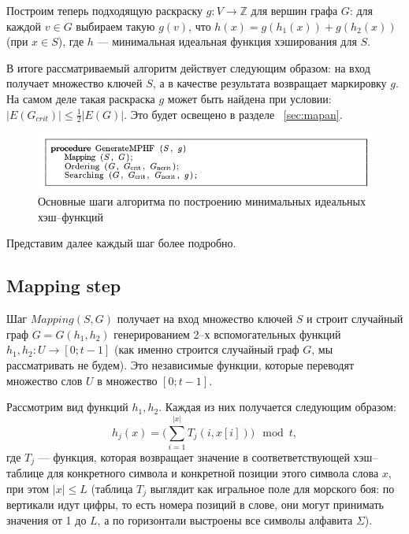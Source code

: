 \documentclass[specialist,
               substylefile = spbu.rtx,
               subf,href,colorlinks=true, 12pt]{disser}
\begin{document}
Построим теперь подходящую раскраску $g : V \longrightarrow \mathbb{Z}$ для вершин графа $G$: для каждой $v \in G$ выбираем такую $g(v)$, что $h(x) = g(h_1(x)) + g(h_2(x))$ (при $x \in S$), где $h$ --- минимальная идеальная функция хэширования для $S$.

В итоге рассматриваемый алгоритм действует следующим образом: на вход получает множество ключей $S$, а в качестве результата возвращает маркировку $g$. На самом деле такая раскраска $g$ может быть найдена при условии: $|E(G_{crit})| \leq \frac{1}{2}|E(G)|$. Это будет освещено в разделе ~\ref{sec:mapan}.

\begin{figure}[h]
\begin{center}
\includegraphics[scale=0.5]{imgs/proc.jpg}
\caption{Основные шаги алгоритма по построению минимальных идеальных хэш--функций}
\end{center}
\end{figure}
Представим далее каждый шаг более подробно.

\subsection{Mapping step}

Шаг $Mapping (S, G)$ получает на вход множество ключей $S$ и строит случайный граф $G = G(h_1, h_2)$  генерированием 2--х вспомогательных функций $h_1, h_2 : U \longrightarrow [0;t - 1]$ (как именно строится случайный граф $G$, мы рассматривать не будем). Это независимые функции, которые переводят множество слов $U$ в множество $[0; t - 1]$.

Рассмотрим вид функций $h_1, h_2$. Каждая из них получается следующим образом:
%
\begin{equation}\label{eq:1}
h_j(x) = \Big ( \sum \limits_{i = 1}^{|x|}T_j(i,x[i])\Big)\mod t,
\end{equation}
%
где $T_j$ --- функция, которая возвращает значение в соответветствующей хэш--таблице для конкретного символа и конкретной позиции этого символа слова $x$, при этом $|x| \leq L$ (таблица $T_j$ выглядит как игральное поле для морского боя: по вертикали идут цифры, то есть номера позиций в слове, они могут принимать значения от 1 до $L$, а по горизонтали выстроены все символы алфавита $\Sigma$).
\end{document}
